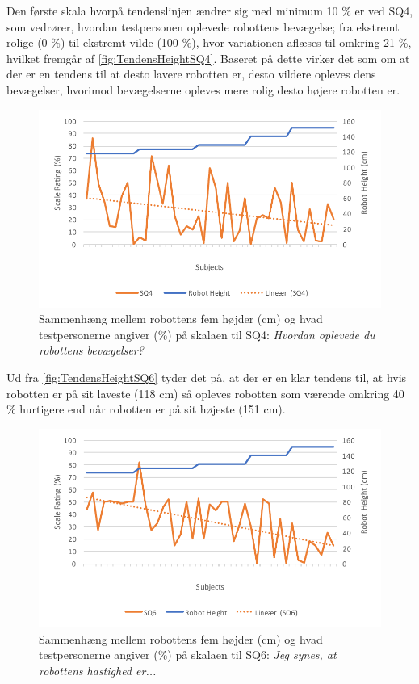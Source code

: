 Den første skala hvorpå tendenslinjen ændrer sig med minimum 10 \% er ved SQ4, som vedrører, hvordan testpersonen oplevede robottens bevægelse; fra ekstremt rolige (0 \%) til ekstremt vilde (100 \%), hvor variationen aflæses til omkring 21 \%, hvilket fremgår af \autoref{fig:TendensHeightSQ4}. Baseret på dette virker det som om at der er en tendens til at desto lavere robotten er, desto vildere opleves dens bevægelser, hvorimod bevægelserne opleves mere rolig desto højere robotten er. 
%
\begin{figure}[H]
\centering
\includegraphics[width=\textwidth]{Figure/DatabehandlingSkalaer/TendensHeight/HeightSQ4}
\caption{Sammenhæng mellem robottens fem højder (cm) og hvad testpersonerne angiver (\%) på skalaen til SQ4: \textit{Hvordan oplevede du robottens bevægelser?}}
\label{fig:TendensHeightSQ4}
\end{figure}
\noindent
%
Ud fra \autoref{fig:TendensHeightSQ6} tyder det på, at der er en klar tendens til, at hvis robotten er på sit laveste (118 cm) så opleves robotten som værende omkring 40 \% hurtigere end når robotten er på sit højeste (151 cm).
%
\begin{figure}[H]
\centering
\includegraphics[width=\textwidth]{Figure/DatabehandlingSkalaer/TendensHeight/HeightSQ6}
\caption{Sammenhæng mellem robottens fem højder (cm) og hvad testpersonerne angiver (\%) på skalaen til SQ6: \textit{Jeg synes, at robottens hastighed er...}}
\label{fig:TendensHeightSQ6}
\end{figure}
